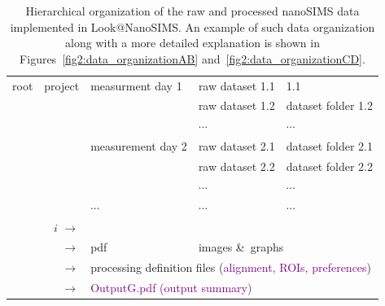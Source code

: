 \documentclass[a4paper, 11pt]{article}
\begin{document}
\begin{table}[hb]
\centering
\caption{\label{tab1:file_structure} Hierarchical organization of the raw and processed nanoSIMS data implemented in Look@NanoSIMS. An example of such data organization along with a more detailed explanation is shown in Figures~\ref{fig2:data_organizationAB} and~\ref{fig2:data_organizationCD}.}
\begin{tabular}{l@{ $\rightarrow$ }c@{ $\rightarrow$ }l@{ $\rightarrow$ }l@{ $\rightarrow$ }l}
\hline
root & project & measurment day 1 & raw dataset 1.1 & \color{red}{dataset folder} 1.1\\
\multicolumn{2}{c}{} & & raw dataset 1.2  & dataset folder 1.2\\
\multicolumn{2}{c}{} & & $\cdots$ & $\cdots$ \\
\multicolumn{1}{c}{} & & measurement day 2 & raw dataset 2.1  & dataset folder 2.1\\
\multicolumn{2}{c}{} & & raw dataset 2.2  & dataset folder 2.2\\
\multicolumn{2}{c}{} & & $\cdots$ & $\cdots$\\
\multicolumn{1}{c}{} & & $\cdots$ & $\cdots$ & $\cdots$\\
\hline
\multicolumn{2}{r}{\color{red}{dataset folder} $i$ $\rightarrow$} & \color{orange}{dat} & \multicolumn{2}{l}{\color{orange}{numbers}} \\
\multicolumn{2}{r}{$\rightarrow$} & \textcolor{darkgold}{pdf} & \multicolumn{2}{l}{\textcolor{darkgold}{images \&\ graphs}} \\
\multicolumn{2}{r}{$\rightarrow$} & \multicolumn{3}{l}{\hspace{-2mm}processing definition files (\textcolor{purple}{alignment, ROIs, preferences})} \\
\multicolumn{2}{r}{$\rightarrow$} & \multicolumn{3}{l}{\hspace{-2mm}\textcolor{purple}{OutputG.pdf (output summary)}}\\
\hline
\end{tabular}
\end{table}
\end{document}
